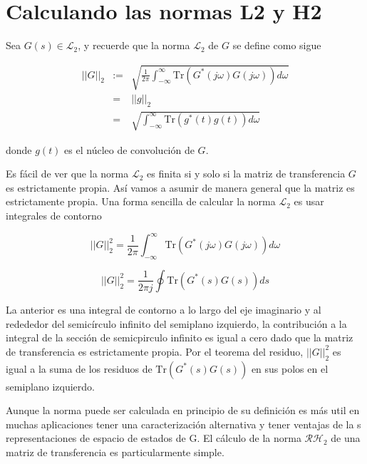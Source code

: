 \section{Calculando las normas L2 y H2}

Sea $G(s) \in \mathcal{L}_2$, y recuerde que la norma $\mathcal{L}_2$ de $G$ se define como sigue

\begin{eqnarray*}
    ||G||_2 & := & \sqrt{\frac{1}{2 \pi} \int_{- \infty}^{\infty}\text{Tr}(G^{*}(j \omega) G(j \omega))d \omega} \\
    &=& ||g||_2 \\
    &=& \sqrt{\int_{- \infty}^{\infty}\text{Tr}(g^{*}(t) g(t))d \omega}
\end{eqnarray*}

donde $g(t)$ es el núcleo de convolución de $G$.

Es fácil de ver que la norma $\mathcal{L}_2$ es finita si y solo si la matriz de transferencia $G$ es estrictamente propia. Así vamos a asumir de manera general que la matriz es estrictamente propia. Una forma sencilla de calcular la norma $\mathcal{L}_2$ es usar integrales de contorno


\begin{equation*}
     ||G||_2^{2} = \frac{1}{2 \pi} \int_{- \infty}^{\infty}\text{Tr}(G^{*}(j \omega) G(j \omega))d \omega
\end{equation*}


\begin{equation*}
     ||G||_2^{2} = \frac{1}{2 \pi j} \oint \text{Tr}(G^{*}(s) G(s))d s
\end{equation*}

La anterior es una integral de contorno a lo largo del eje imaginario y al redededor del semicírculo infinito del semiplano izquierdo, la contribución a la integral de la sección de semicpirculo infinito es igual a cero dado que la matriz de transferencia es estrictamente propia. Por el teorema del residuo, $ ||G||_2^{2}$ es igual a la suma de los residuos de $\text{Tr}(G^{*}(s) G(s))$ en sus polos en el semiplano izquierdo.

Aunque la norma puede ser calculada en principio de su definición es más util en muchas aplicaciones tener una caracterización alternativa y tener ventajas de la s representaciones de espacio de estados de G. El cálculo de la norma $\mathcal{R H}_2$ de una matriz de transferencia es particularmente simple. \\

